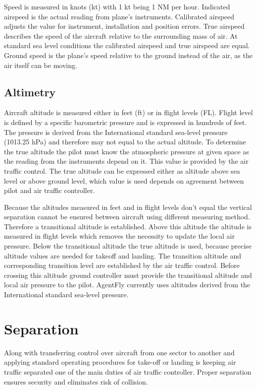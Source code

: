 Speed is measured in knots (kt) with 1 kt being 1 NM per hour. Indicated airspeed is the actual reading from plane's instruments. Calibrated airspeed adjusts the value for instrument, installation and position errors. True airspeed describes the speed of the aircraft relative to the surrounding mass of air. At standard sea level conditions the calibrated airspeed and true airspeed are equal. Ground speed is the plane's speed relative to the ground instead of the air, as the air itself can be moving.

\subsection{Altimetry}

Aircraft altitude is measured either in feet (ft) or in flight levels (FL). Flight level is defined by a specific barometric pressure and is expressed in hundreds of feet. The pressure is derived from the International standard sea-level pressure (1013.25 hPa) and therefore may not equal to the actual altitude. To determine the true altitude the pilot must know the atmospheric pressure at given space as the reading from the instruments depend on it. This value is provided by the air traffic control. The true altitude can be expressed either as altitude above sea level or above ground level, which value is used depends on agreement between pilot and air traffic controller.

Because the altitudes measured in feet and in flight levels don't equal the vertical separation cannot be ensured between aircraft using different measuring method. Therefore a transitional altitude is established. Above this altitude the altitude is measured in flight levels which removes the necessity to update the local air pressure. Below the transitional altitude the true altitude is used, because precise altitude values are needed for takeoff and landing. The transition altitude and corresponding transition level are established by the air traffic control. Before crossing this altitude ground controller must provide the transitional altitude and local air pressure to the pilot. AgentFly currently uses altitudes derived from the International standard sea-level pressure.

\section{Separation}

Along with transferring control over aircraft from one sector to another and applying standard operating procedures for take-off or landing is keeping air traffic separated one of the main duties of air traffic controller. Proper separation ensures security and eliminates risk of collision. \cite[Chapter 2]{order7110}

